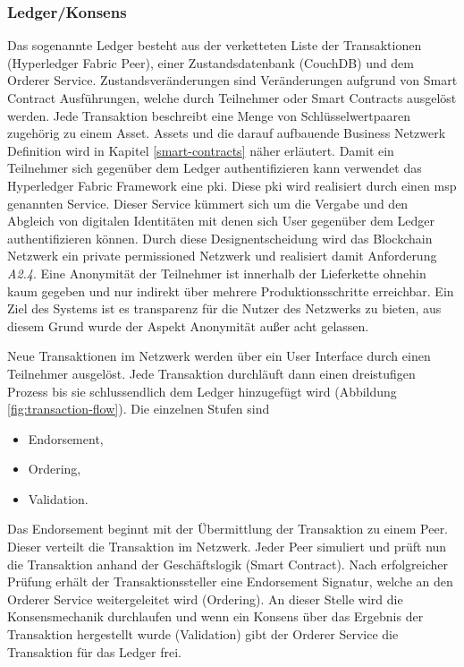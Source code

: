 \subsubsection{Ledger/Konsens}
Das sogenannte Ledger besteht aus der verketteten Liste der Transaktionen (Hyperledger Fabric Peer), einer Zustandsdatenbank (CouchDB) und dem Orderer Service. Zustandsveränderungen sind Veränderungen aufgrund von Smart Contract Ausführungen, welche durch Teilnehmer oder Smart Contracts ausgelöst werden. Jede Transaktion beschreibt eine Menge von Schlüsselwertpaaren zugehörig zu einem Asset. Assets und die darauf aufbauende Business Netzwerk Definition wird in Kapitel \ref{smart-contracts} näher erläutert. Damit ein Teilnehmer sich gegenüber dem Ledger authentifizieren kann verwendet das Hyperledger Fabric Framework eine \acf{pki}. Diese \ac{pki} wird realisiert durch einen \ac{msp} genannten Service. Dieser Service kümmert sich um die Vergabe und den Abgleich von digitalen Identitäten mit denen sich User gegenüber dem Ledger authentifizieren können. Durch diese Designentscheidung wird das Blockchain Netzwerk ein private permissioned Netzwerk und realisiert damit Anforderung \textit{A2.4}. Eine Anonymität der Teilnehmer ist innerhalb der Lieferkette ohnehin kaum gegeben und nur indirekt über mehrere Produktionsschritte erreichbar. Ein Ziel des Systems ist es transparenz für die Nutzer des Netzwerks zu bieten, aus diesem Grund wurde der Aspekt Anonymität außer acht gelassen. 

Neue Transaktionen im Netzwerk werden über ein User Interface durch einen Teilnehmer ausgelöst. Jede Transaktion durchläuft dann einen dreistufigen Prozess bis sie schlussendlich dem Ledger hinzugefügt wird (Abbildung \ref{fig:transaction-flow}). Die einzelnen Stufen sind 

\begin{itemize}
	\item Endorsement,
	\item Ordering,
	\item Validation.
\end{itemize}

Das Endorsement beginnt mit der Übermittlung der Transaktion zu einem Peer. Dieser verteilt die Transaktion im Netzwerk. Jeder Peer simuliert und prüft nun die Transaktion anhand der Geschäftslogik (Smart Contract). Nach erfolgreicher Prüfung erhält der Transaktionssteller eine Endorsement Signatur, welche an den Orderer Service weitergeleitet wird (Ordering). An dieser Stelle wird die Konsensmechanik durchlaufen und wenn ein Konsens über das Ergebnis der Transaktion hergestellt wurde (Validation) gibt der Orderer Service die Transaktion für das Ledger frei.

